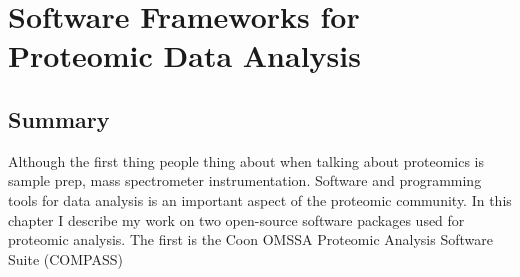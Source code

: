 \chapter{Software Frameworks for Proteomic Data Analysis}

\section{Summary}
Although the first thing people thing about when talking about proteomics is sample prep, mass spectrometer instrumentation. 
Software and programming tools for data analysis is an important aspect of the proteomic community. In this chapter I describe my work on two open-source software packages used for proteomic analysis. The first is the Coon OMSSA Proteomic Analysis Software Suite (COMPASS)

